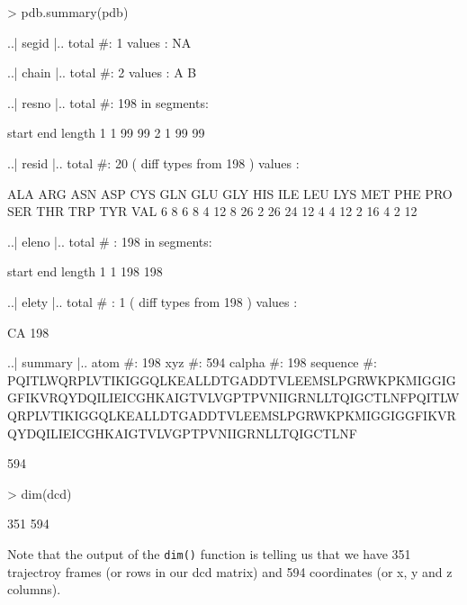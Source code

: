 \documentclass[letter]{article}
\begin{document}
\begin{Schunk}
\begin{Sinput}
> pdb.summary(pdb)
\end{Sinput}
\begin{Soutput}
..| segid |..
total #: 1 
values : NA 


..| chain |..
total #: 2 
values : A B 


..| resno |..
total #: 198 
in segments: 

  start end length
1     1  99     99
2     1  99     99


..| resid |..
total #: 20 ( diff types from 198 )
values : 

ALA ARG ASN ASP CYS GLN GLU GLY HIS ILE LEU LYS MET PHE PRO SER THR TRP TYR VAL 
  6   8   6   8   4  12   8  26   2  26  24  12   4   4  12   2  16   4   2  12 


..| eleno |..
total # : 198 
in segments: 

  start end length
1     1 198    198


..| elety |..
total # : 1 ( diff types from 198 )
values : 

 CA 
198 


..| summary |..
atom     #: 198 
xyz      #: 594 
calpha   #: 198 
sequence #: PQITLWQRPLVTIKIGGQLKEALLDTGADDTVLEEMSLPGRWKPKMIGGIGGFIKVRQYDQILIEICGHKAIGTVLVGPTPVNIIGRNLLTQIGCTLNFPQITLWQRPLVTIKIGGQLKEALLDTGADDTVLEEMSLPGRWKPKMIGGIGGFIKVRQYDQILIEICGHKAIGTVLVGPTPVNIIGRNLLTQIGCTLNF 
\end{Soutput}
\begin{Soutput}
[1] 594
\end{Soutput}
\begin{Sinput}
> dim(dcd)
\end{Sinput}
\begin{Soutput}
[1] 351 594
\end{Soutput}
\end{Schunk}
Note that the output of the \texttt{dim()} function is telling us that we have 351 trajectroy frames (or rows in our dcd matrix) and 594 coordinates (or x, y and z columns).
\end{document}
